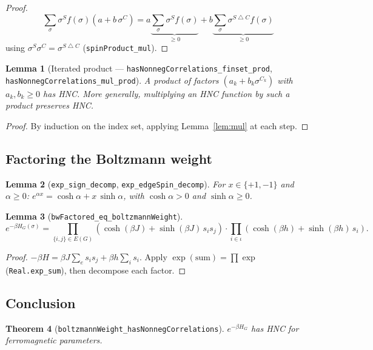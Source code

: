 \documentclass[a4paper,11pt]{article}
\newtheorem{theorem}{Theorem}
\newtheorem{lemma}[theorem]{Lemma}
\begin{document}
\begin{proof}
\[
  \sum_\sigma \sigma^S f(\sigma)(a + b\,\sigma^C)
  = a \underbrace{\sum_\sigma \sigma^S f(\sigma)}_{\geq 0}
  + b \underbrace{\sum_\sigma \sigma^{S \bigtriangleup C} f(\sigma)}_{\geq 0}
\]
using $\sigma^S \sigma^C = \sigma^{S \bigtriangleup C}$
(\texttt{spinProduct\_mul}).
\end{proof}

\begin{lemma}[Iterated product --- \texttt{hasNonnegCorrelations\_finset\_prod},
\texttt{hasNonnegCorrelations\_mul\_prod}]
A product of factors $(a_k + b_k \sigma^{C_k})$ with $a_k, b_k \geq 0$
has HNC. More generally, multiplying an HNC function by such a product
preserves HNC.
\end{lemma}

\begin{proof}
By induction on the index set, applying Lemma~\ref{lem:mul} at each step.
\end{proof}

\subsection{Factoring the Boltzmann weight}

\begin{lemma}[\texttt{exp\_sign\_decomp}, \texttt{exp\_edgeSpin\_decomp}]
For $x \in \{+1, -1\}$ and $\alpha \geq 0$:
$e^{\alpha x} = \cosh\alpha + x\,\sinh\alpha$,
with $\cosh\alpha > 0$ and $\sinh\alpha \geq 0$.
\end{lemma}

\begin{lemma}[\texttt{bwFactored\_eq\_boltzmannWeight}]
\[
  e^{-\beta H_G(\sigma)}
  = \prod_{\{i,j\} \in E(G)} (\cosh(\beta J) + \sinh(\beta J)\,s_i s_j)
  \cdot \prod_{i \in \iota} (\cosh(\beta h) + \sinh(\beta h)\,s_i).
\]
\end{lemma}

\begin{proof}
$-\beta H = \beta J \sum_e s_i s_j + \beta h \sum_i s_i$.
Apply $\exp(\text{sum}) = \prod\exp$ (\texttt{Real.exp\_sum}),
then decompose each factor.
\end{proof}

\subsection{Conclusion}

\begin{theorem}[\texttt{boltzmannWeight\_hasNonnegCorrelations}]
$e^{-\beta H_G}$ has HNC for ferromagnetic parameters.
\end{theorem}
\end{document}
